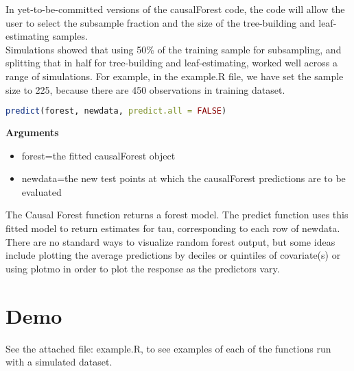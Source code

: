 \documentclass{article}
\begin{document}
In yet-to-be-committed versions of the causalForest code, the code will allow the user to select the subsample fraction and the size of the tree-building and leaf-estimating samples.  \\
Simulations showed that using 50\% of the training sample for subsampling, and splitting that in half for tree-building and leaf-estimating, worked well across a range of simulations. For example, in the example.R file, we have set the sample size to 225, because there are 450 observations in training dataset.

\begin{lstlisting}[language=R]
predict(forest, newdata, predict.all = FALSE)
\end{lstlisting}

\textbf{Arguments} \\
\begin{itemize}
  \item forest=the fitted causalForest object
  \item newdata=the new test points at which the causalForest predictions are to be evaluated 
\end{itemize}

The Causal Forest function returns a forest model. The predict function uses this fitted model to return estimates for tau, corresponding to each row of newdata.
There are no standard ways to visualize random forest output, but some ideas include plotting the average predictions by deciles or quintiles of covariate(s) or using plotmo in order to plot the response as the predictors vary.

 \section{Demo}
 See the attached file: example.R, to see examples of each of the functions run with a simulated dataset. 
 
 
\end{document}
